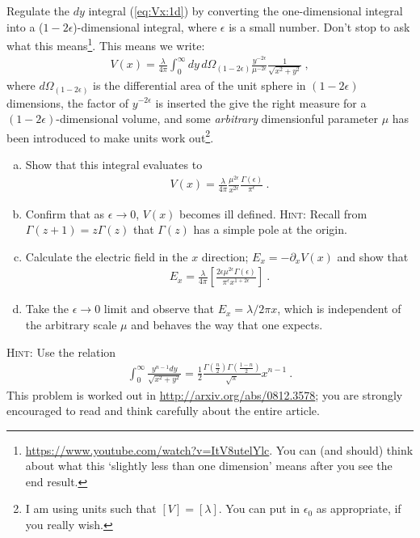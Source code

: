 \documentclass[12pt]{article}
\numberwithin{equation}{section}    %
\begin{document}
Regulate the $dy$ integral (\ref{eq:Vx:1d}) by converting the one-dimensional integral into a ($1-2\epsilon$)-dimensional integral, where $\epsilon$ is a small number. Don't stop to ask what this means\footnote{\url{https://www.youtube.com/watch?v=ItV8utelYlc}. You can (and should) think about what this `slightly less than one dimension' means after you see the end result.}. This means we write:
\begin{align}
	V(x) = \frac{\lambda}{4\pi} \int_0^\infty dy\,d\Omega_{(1-2\epsilon)} \frac{y^{-2\epsilon}}{\mu^{-2\epsilon}}\frac{1}{\sqrt{x^2+y^2}} \ ,
\end{align}
where $d\Omega_{(1-2\epsilon)}$ is the differential area of the unit sphere in $(1-2\epsilon)$ dimensions, the factor of $y^{-2\epsilon}$ is inserted the give the right measure for a $(1-2\epsilon)$-dimensional volume, and some \emph{arbitrary} dimensionful parameter $\mu$ has been introduced to make units work out\footnote{I am using units such that $[V] = [\lambda]$. You can put in $\epsilon_0$ as appropriate, if you really wish.}. 
\begin{enumerate}[(a)]
\item Show that this integral evaluates to
\begin{align}
	V(x) = \frac{\lambda}{4\pi} \frac{\mu^{2\epsilon}}{x^{2\epsilon}} \frac{\Gamma(\epsilon)}{\pi^\epsilon} \ .
\end{align}
\item Confirm that as $\epsilon\to 0$, $V(x)$ becomes ill defined. \textsc{Hint}: Recall from $\Gamma(z+1) = z \Gamma(z)$ that $\Gamma(z)$ has a simple pole at the origin.
\item Calculate the electric field in the $x$ direction; $E_x = -\partial_xV(x)$ and show that
\begin{align}
	E_x = \frac{\lambda}{4\pi} \left[ \frac{2\epsilon \mu^{2\epsilon} \Gamma(\epsilon)}{\pi^\epsilon x^{1+2\epsilon}} \right] \ .
\end{align}
\item Take the $\epsilon \to 0$ limit and observe that $E_x = \lambda/2\pi x$, which is independent of the arbitrary scale $\mu$ and behaves the way that one expects. 
\end{enumerate}

\textsc{Hint:} Use the relation
\begin{align}
	\int_0^\infty \frac{y^{n-1}dy}{\sqrt{x^2+y^2}} = \frac{1}{2}\frac{\Gamma(\frac n2)\Gamma(\frac{1-n}2)}{\sqrt{\pi}}x^{n-1} \ .
\end{align}
This problem is worked out in \url{http://arxiv.org/abs/0812.3578}; you are strongly encouraged to read and think carefully about the entire article.
\end{document}
